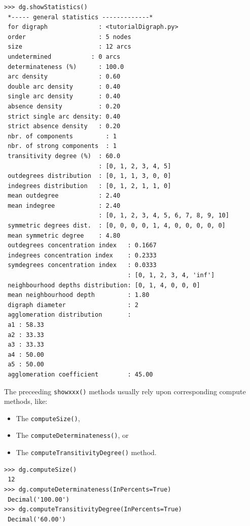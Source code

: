 \begin{lstlisting}[caption={Inspecting a \texttt{Digraph} object},label=list:1.5]
>>> dg.showStatistics()
 *----- general statistics -------------*
 for digraph              : <tutorialDigraph.py>
 order                    : 5 nodes
 size                     : 12 arcs
 undetermined           : 0 arcs
 determinateness (%)      : 100.0
 arc density              : 0.60
 double arc density       : 0.40
 single arc density       : 0.40
 absence density          : 0.20
 strict single arc density: 0.40
 strict absence density   : 0.20
 nbr. of components         : 1
 nbr. of strong components  : 1
 transitivity degree (%)  : 60.0
                          : [0, 1, 2, 3, 4, 5]
 outdegrees distribution  : [0, 1, 1, 3, 0, 0]
 indegrees distribution   : [0, 1, 2, 1, 1, 0]
 mean outdegree           : 2.40
 mean indegree            : 2.40
                          : [0, 1, 2, 3, 4, 5, 6, 7, 8, 9, 10]
 symmetric degrees dist.  : [0, 0, 0, 0, 1, 4, 0, 0, 0, 0, 0]
 mean symmetric degree    : 4.80
 outdegrees concentration index   : 0.1667
 indegrees concentration index    : 0.2333
 symdegrees concentration index   : 0.0333
                                  : [0, 1, 2, 3, 4, 'inf']
 neighbourhood depths distribution: [0, 1, 4, 0, 0, 0]
 mean neighbourhood depth         : 1.80
 digraph diameter                 : 2
 agglomeration distribution       :
 a1 : 58.33
 a2 : 33.33
 a3 : 33.33
 a4 : 50.00
 a5 : 50.00
 agglomeration coefficient        : 45.00
\end{lstlisting}

The preceeding \texttt{showxxx()} methods usually rely upon corresponding compute methods, like:
\begin{itemize}
\item The \texttt{computeSize()},
\item The \texttt{computeDeterminateness()}, or
\item The \texttt{computeTransitivityDegree()} method.
\end{itemize}
\begin{lstlisting}[caption={Various \texttt{computexxx()} methods.}label=list:1.6]
>>> dg.computeSize()
 12
>>> dg.computeDeterminateness(InPercents=True)
 Decimal('100.00')
>>> dg.computeTransitivityDegree(InPercents=True)
 Decimal('60.00')
\end{lstlisting}

